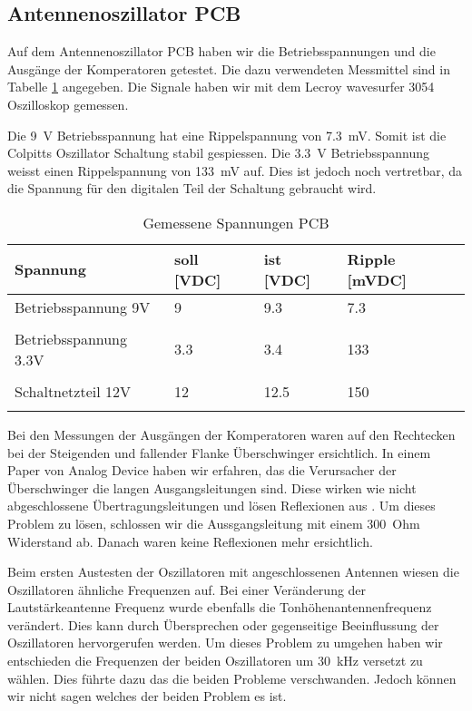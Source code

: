 \subsection{Antennenoszillator PCB}\label{subsec:PCB}
Auf dem Antennenoszillator PCB haben wir die Betriebsspannungen und die Ausgänge der Komperatoren getestet. Die dazu verwendeten Messmittel sind in Tabelle \ref{tab:Gemessene_Spannungen_PCB} angegeben.   Die Signale haben wir mit dem Lecroy wavesurfer 3054 Oszilloskop gemessen. 

Die \SI{9}{V} Betriebsspannung hat eine Rippelspannung von \SI{7.3}{mV}. Somit ist die Colpitts Oszillator Schaltung stabil gespiessen. Die \SI{3.3}{V} Betriebsspannung weisst einen Rippelspannung von \SI{133}{mV} auf. Dies ist jedoch noch vertretbar, da die Spannung für den digitalen Teil der Schaltung gebraucht wird.
\begin{table}[H]
	\centering
	\caption{Gemessene Spannungen PCB}
	\label{tab:Gemessene_Spannungen_PCB}
	\begin{tabular}{l|l|l|l}
		\textbf{Spannung} & \textbf{soll [VDC]} & \textbf{ist [VDC]} &	\textbf{Ripple [mVDC]}\\
		\hline \hline
		
		Betriebsspannung 9V & 9 & 9.3 &  7.3 \\ 
		&      &   &   \\ 
		\hline
		Betriebsspannung 3.3V & 3.3 & 3.4 &  133 \\ 
		&     &     &   \\ 
		\hline
		Schaltnetzteil 12V & 12 & 12.5 &  150 \\ 
		&     &       &   \\ 
		\hline
		
	\end{tabular}
\end{table} 

Bei den Messungen der Ausgängen der Komperatoren waren auf den Rechtecken bei der Steigenden und fallender Flanke Überschwinger ersichtlich. In einem Paper von Analog Device haben wir erfahren, das die Verursacher der Überschwinger die langen Ausgangsleitungen sind. Diese wirken wie nicht abgeschlossene Übertragungsleitungen und lösen Reflexionen aus \cite{comparator_techniques}. Um dieses Problem zu lösen, schlossen wir die Aussgangsleitung mit einem \SI{300}{Ohm} Widerstand ab. Danach waren keine Reflexionen mehr ersichtlich.

Beim ersten Austesten der Oszillatoren mit angeschlossenen Antennen wiesen die Oszillatoren ähnliche Frequenzen auf. Bei einer Veränderung der Lautstärkeantenne Frequenz wurde ebenfalls die Tonhöhenantennenfrequenz verändert. Dies kann durch Übersprechen oder gegenseitige Beeinflussung der Oszillatoren hervorgerufen werden. Um dieses Problem zu umgehen haben wir entschieden die Frequenzen der beiden Oszillatoren um \SI{30}{kHz} versetzt zu wählen. Dies führte dazu das die beiden Probleme verschwanden. Jedoch können wir nicht sagen welches der beiden Problem es ist.

